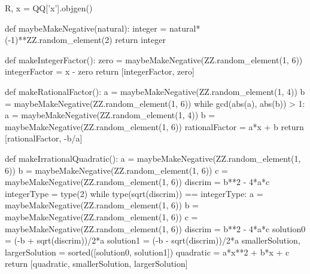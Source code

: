 \documentclass{ximera}
\begin{document}
\begin{sagesilent}
R, x = QQ['x'].objgen()

def maybeMakeNegative(natural):
    integer = natural*(-1)**ZZ.random_element(2)
    return integer 

def makeIntegerFactor():
    zero = maybeMakeNegative(ZZ.random_element(1, 6))
    integerFactor = x - zero
    return [integerFactor, zero]

def makeRationalFactor():
    a = maybeMakeNegative(ZZ.random_element(1, 4))
    b = maybeMakeNegative(ZZ.random_element(1, 6))
    while gcd(abs(a), abs(b)) > 1:
        a = maybeMakeNegative(ZZ.random_element(1, 4))
        b = maybeMakeNegative(ZZ.random_element(1, 6))
    rationalFactor = a*x + b
    return [rationalFactor, -b/a]

def makeIrrationalQuadratic():
    a = maybeMakeNegative(ZZ.random_element(1, 6))
    b = maybeMakeNegative(ZZ.random_element(1, 6))
    c = maybeMakeNegative(ZZ.random_element(1, 6))
    discrim = b**2 - 4*a*c
    integerType = type(2)
    while type(sqrt(discrim)) == integerType:
        a = maybeMakeNegative(ZZ.random_element(1, 6))
        b = maybeMakeNegative(ZZ.random_element(1, 6))
        c = maybeMakeNegative(ZZ.random_element(1, 6))
        discrim = b**2 - 4*a*c
    solution0 = (-b + sqrt(discrim))/2*a
    solution1 = (-b - sqrt(discrim))/2*a
    smallerSolution, largerSolution = sorted([solution0, solution1])
    quadratic = a*x**2 + b*x + c
    return [quadratic, smallerSolution, largerSolution]


\end{sagesilent}
\end{document}
